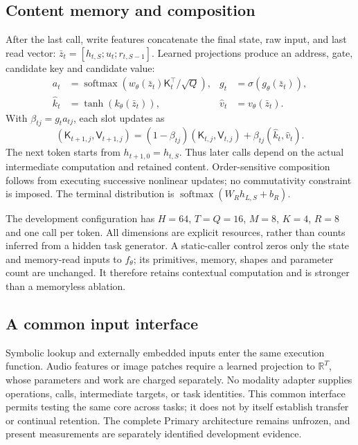 \subsection{Content memory and composition}

After the last call, write features concatenate the final state, raw input,
and last read vector: $\bar z_t=[h_{t,S};u_t;r_{t,S-1}]$. Learned projections
produce an address, gate, candidate key and candidate value:
\begin{align}
 a_t&=\operatorname{softmax}
    (w_\theta(\bar z_t)\mathsf K_t^\top/\sqrt Q),
       &g_t&=\sigma(g_\theta(\bar z_t)),\\
 \widehat k_t&=\tanh(k_\theta(\bar z_t)),
       &\widehat v_t&=v_\theta(\bar z_t).
\end{align}
With $\beta_{tj}=g_ta_{tj}$, each slot updates as
\begin{equation}
 (\mathsf K_{t+1,j},\mathsf V_{t+1,j})=
 (1-\beta_{tj})(\mathsf K_{t,j},\mathsf V_{t,j})+
 \beta_{tj}(\widehat k_t,\widehat v_t).
\end{equation}
The next token starts from $h_{t+1,0}=h_{t,S}$. Thus later calls depend on
the actual intermediate computation and retained content. Order-sensitive
composition follows from executing successive nonlinear updates; no
commutativity constraint is imposed. The terminal distribution is
$\operatorname{softmax}(W_Rh_{L,S}+b_R)$.

The development configuration has $H=64$, $T=Q=16$, $M=8$, $K=4$, $R=8$ and
one call per token. All dimensions are explicit resources, rather than counts
inferred from a hidden task generator. A static-caller control zeros only the
state and memory-read inputs to $f_\theta$; its primitives, memory, shapes and
parameter count are unchanged. It therefore retains contextual computation
and is stronger than a memoryless ablation.

\subsection{A common input interface}

Symbolic lookup and externally embedded inputs enter the same execution
function. Audio features or image patches require a learned projection to
$\mathbb R^T$, whose parameters and work are charged separately. No modality
adapter supplies operations, calls, intermediate targets, or task identities.
This common interface permits testing the same core across tasks; it does not
by itself establish transfer or continual retention. The complete Primary
architecture remains unfrozen, and present measurements are separately
identified development evidence.
